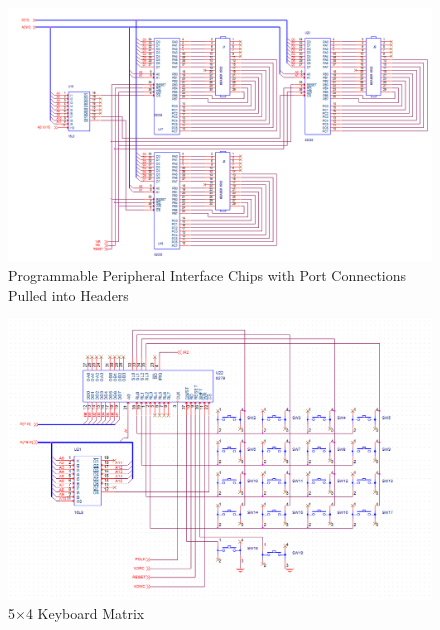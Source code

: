         \begin{figure}[ht]
            \begin{center}
                \includegraphics[width=1\textwidth]{figures/schematics/page5.png}
                \caption{Programmable Peripheral Interface Chips with Port Connections Pulled into Headers} \label{fig:page5}
            \end{center}
        \end{figure}

        \begin{figure}[ht]
            \begin{center}
                \includegraphics[width=1\textwidth]{figures/schematics/page6.png}
                \caption{5$\times$4 Keyboard Matrix} \label{fig:page6}
            \end{center}
        \end{figure}

